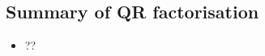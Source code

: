 
\begin{draft}
\section{Summary of QR factorisation}
\label{sec:sumqr}

\begin{itemize}
\def\index#1{}%

\item ??
\end{itemize}


\end{draft}

\makeanswers
